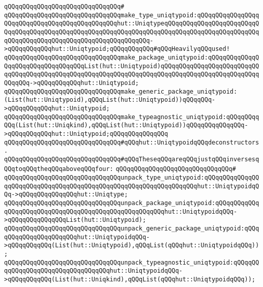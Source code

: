 \verb|qQQqqQQqqQQqqQQqqQQqqQQqqQQqqQQq#|\newline
\verb|qQQqqQQqqQQqqQQqqQQqqQQqqQQqqQQqmake_type_uniqtypoid:qQQqqQQqqQQqqQQqqQQqqQQqqQQqqQQqqQQqqQQqqQQqqQQqhut::UniqtypeqQQqqQQqqQQqqQQqqQQqqQQqqQQqqQQqqQQqqQQqqQQqqQQqqQQqqQQqqQQqqQQqqQQqqQQqqQQqqQQqqQQqqQQqqQQqqQQqqQQqqQQqqQQqqQQqqQQqqQQqqQQqqQQqqQQqqQQq->qQQqqQQqqQQqhut::Uniqtypoid;qQQqqQQqqQQq#qQQqHeavilyqQQqused!|\newline
\verb|qQQqqQQqqQQqqQQqqQQqqQQqqQQqqQQqmake_package_uniqtypoid:qQQqqQQqqQQqqQQqqQQqqQQqqQQqqQQqqQQqList(hut::Uniqtypoid)qQQqqQQqqQQqqQQqqQQqqQQqqQQqqQQqqQQqqQQqqQQqqQQqqQQqqQQqqQQqqQQqqQQqqQQqqQQqqQQqqQQqqQQqqQQqqQQqqQQqqQQq->qQQqqQQqqQQqhut::Uniqtypoid;|\newline
\verb|qQQqqQQqqQQqqQQqqQQqqQQqqQQqqQQqmake_generic_package_uniqtypoid:(List(hut::Uniqtypoid),qQQqList(hut::Uniqtypoid))qQQqqQQq->qQQqqQQqqQQqhut::Uniqtypoid;|\newline
\verb|qQQqqQQqqQQqqQQqqQQqqQQqqQQqqQQqmake_typeagnostic_uniqtypoid:qQQqqQQqqQQq(List(hut::Uniqkind),qQQqList(hut::Uniqtypoid))qQQqqQQqqQQqqQQq->qQQqqQQqqQQqhut::Uniqtypoid;qQQqqQQqqQQqqQQq|\newline
\newline
\verb|qQQqqQQqqQQqqQQqqQQqqQQqqQQqqQQq#qQQqhut::UniqtypoidqQQqdeconstructors.|\newline
\verb|qQQqqQQqqQQqqQQqqQQqqQQqqQQqqQQq#qQQqTheseqQQqareqQQqjustqQQqinversesqQQqtoqQQqtheqQQqaboveqQQqfour:|\newline
\verb|qQQqqQQqqQQqqQQqqQQqqQQqqQQqqQQq#|\newline
\verb|qQQqqQQqqQQqqQQqqQQqqQQqqQQqqQQqunpack_type_uniqtypoid:qQQqqQQqqQQqqQQqqQQqqQQqqQQqqQQqqQQqqQQqqQQqqQQqqQQqqQQqqQQqqQQqqQQqhut::UniqtypoidqQQq->qQQqqQQqqQQqqQQqhut::Uniqtype;|\newline
\verb|qQQqqQQqqQQqqQQqqQQqqQQqqQQqqQQqunpack_package_uniqtypoid:qQQqqQQqqQQqqQQqqQQqqQQqqQQqqQQqqQQqqQQqqQQqqQQqqQQqqQQqhut::UniqtypoidqQQq->qQQqqQQqqQQqqQQqList(hut::Uniqtypoid);|\newline
\verb|qQQqqQQqqQQqqQQqqQQqqQQqqQQqqQQqunpack_generic_package_uniqtypoid:qQQqqQQqqQQqqQQqqQQqqQQqhut::UniqtypoidqQQq->qQQqqQQqqQQq(List(hut::Uniqtypoid),qQQqList(qQQqhut::UniqtypoidqQQq));|\newline
\verb|qQQqqQQqqQQqqQQqqQQqqQQqqQQqqQQqunpack_typeagnostic_uniqtypoid:qQQqqQQqqQQqqQQqqQQqqQQqqQQqqQQqqQQqhut::UniqtypoidqQQq->qQQqqQQqqQQq(List(hut::Uniqkind),qQQqList(qQQqhut::UniqtypoidqQQq));|\newline
\newline
